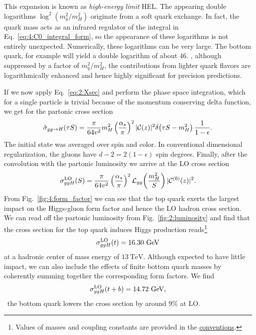 This expansion is known as \textit{high-energy limit} \acs{HEL}. The appearing double logarithms $\log^2 (m_q^2/m_H^2)$ originate from a soft quark exchange. In fact, the quark mass acts as an infrared regulator of the integral in Eq.~\ref{eq:4:C0_integral_form}, so the appearance of these logarithms is not entirely unexpected. Numerically, these logarithms can be very large. The bottom quark, for example will yield a double logarithm of about $46$. \Ie, although suppressed by a factor of $m_q^2/m_H^2$, the contributions from lighter quark flavors are logarithmically enhanced and hence highly significant for precision predictions.

If we now apply Eq.~\eqref{eq:2:Xsec} and perform the phase space integration, which for a single particle is trivial because of the momentum conserving delta function, we get for the partonic cross section
\begin{equation}
\hat{\sigma}_{gg \rightarrow H}(\tau S) = \frac{\pi}{64 v^2} m_H^2 \left( \frac{\alpha_s}{\pi} \right)^2 |\mathcal{C}(z)|^2 \delta\! \left(\tau S - m_H^2 \right) \frac{1}{1 - \epsilon}.
\label{eq:4:ggH_cross_section}
\end{equation}
The initial state was averaged over spin and color. In conventional dimensional regularization, the gluons have $d - 2 = 2 (1 - \epsilon)$ spin degrees. Finally, after the convolution with the partonic luminosity we arrive at the LO cross section
\begin{equation}
\sigma_{ggH}^{\text{LO}}(S) = \frac{\pi}{64v^2} \left(\frac{\alpha_s}{\pi} \right)^2 \mathcal{L}_{gg}\!\left(\frac{m_H^2}{S} \right) |\mathcal{C}^{(0)}(z)|^2.
\end{equation}
From Fig.~\ref{fig:4:form_factor} we can see that the top quark exerts the largest impact on the Higgs-gluon form factor and hence the \acs{LO} hadron cross section. We can read off the partonic luminosity from Fig.~\ref{fig:2:luminosity} and find that the cross section for the top quark induces Higgs production reads\footnote{Values of masses and coupling constants are provided in the \hyperref[chap:notation_and_conventions]{conventions}.}
\begin{equation}
\sigma_{ggH}^{\text{LO}} (t) = 16.30\ \GeV
\end{equation}
at a hadronic center of mass energy of $13\ \text{TeV}$. Although expected to have little impact, we can also include the effects of finite bottom quark masses by coherently summing together the corresponding form factors. We find
\begin{equation}
\sigma_{ggH}^{\text{LO}}(t+b) = 14.72\ \GeV,
\end{equation}
\ie\ the bottom quark lowers the cross section by around $9\%$ at \acs{LO}.


